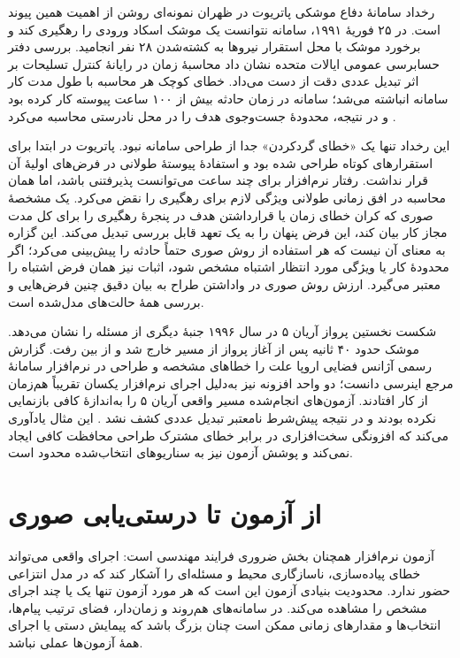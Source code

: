 رخداد سامانهٔ دفاع موشکی پاتریوت در ظهران نمونه‌ای روشن از اهمیت همین پیوند است. در ۲۵ فوریهٔ ۱۹۹۱، سامانه نتوانست یک موشک اسکاد ورودی را رهگیری کند و برخورد موشک با محل استقرار نیروها به کشته‌شدن ۲۸ نفر انجامید. بررسی دفتر حسابرسی عمومی ایالات متحده نشان داد محاسبهٔ زمان در رایانهٔ کنترل تسلیحات بر اثر تبدیل عددی دقت از دست می‌داد. خطای کوچک هر محاسبه با طول مدت کار سامانه انباشته می‌شد؛ سامانه در زمان حادثه بیش از ۱۰۰ ساعت پیوسته کار کرده بود و در نتیجه، محدودهٔ جست‌وجوی هدف را در محل نادرستی محاسبه می‌کرد \cite{GAO1992Patriot}.

این رخداد تنها یک «خطای گردکردن» جدا از طراحی سامانه نبود. پاتریوت در ابتدا برای استقرارهای کوتاه طراحی شده بود و استفادهٔ پیوستهٔ طولانی در فرض‌های اولیهٔ آن قرار نداشت. رفتار نرم‌افزار برای چند ساعت می‌توانست پذیرفتنی باشد، اما همان محاسبه در افق زمانی طولانی ویژگی لازم برای رهگیری را نقض می‌کرد. یک مشخصهٔ صوری که کران خطای زمان یا قرارداشتن هدف در پنجرهٔ رهگیری را برای کل مدت مجاز کار بیان کند، این فرض پنهان را به یک تعهد قابل بررسی تبدیل می‌کند. این گزاره به معنای آن نیست که هر استفاده از روش صوری حتماً حادثه را پیش‌بینی می‌کرد؛ اگر محدودهٔ کار یا ویژگی مورد انتظار اشتباه مشخص شود، اثبات نیز همان فرض اشتباه را معتبر می‌گیرد. ارزش روش صوری در واداشتن طراح به بیان دقیق چنین فرض‌هایی و بررسی همهٔ حالت‌های مدل‌شده است.

شکست نخستین پرواز آریان ۵ در سال ۱۹۹۶ جنبهٔ دیگری از مسئله را نشان می‌دهد. موشک حدود ۴۰ ثانیه پس از آغاز پرواز از مسیر خارج شد و از بین رفت. گزارش رسمی آژانس فضایی اروپا علت را خطاهای مشخصه و طراحی در نرم‌افزار سامانهٔ مرجع اینرسی دانست؛ دو واحد افزونه نیز به‌دلیل اجرای نرم‌افزار یکسان تقریباً هم‌زمان از کار افتادند. آزمون‌های انجام‌شده مسیر واقعی آریان ۵ را به‌اندازهٔ کافی بازنمایی نکرده بودند و در نتیجه پیش‌شرط نامعتبر تبدیل عددی کشف نشد \cite{ESA1996Ariane}. این مثال یادآوری می‌کند که افزونگی سخت‌افزاری در برابر خطای مشترک طراحی محافظت کافی ایجاد نمی‌کند و پوشش آزمون نیز به سناریوهای انتخاب‌شده محدود است.

\section{از آزمون تا درستی‌یابی صوری}

آزمون نرم‌افزار همچنان بخش ضروری فرایند مهندسی است: اجرای واقعی می‌تواند خطای پیاده‌سازی، ناسازگاری محیط و مسئله‌ای را آشکار کند که در مدل انتزاعی حضور ندارد. محدودیت بنیادی آزمون این است که هر مورد آزمون تنها یک یا چند اجرای مشخص را مشاهده می‌کند. در سامانه‌های هم‌روند و زمان‌دار، فضای ترتیب پیام‌ها، انتخاب‌ها و مقدارهای زمانی ممکن است چنان بزرگ باشد که پیمایش دستی یا اجرای همهٔ آزمون‌ها عملی نباشد.

